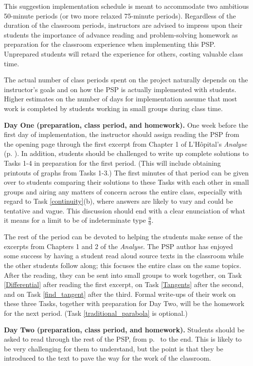 \documentclass[11pt]{article}
\begin{document}
This suggestion implementation schedule is meant to accommodate two ambitious 50-minute periods (or two more relaxed 75-minute periods). Regardless of the duration of the classroom periods, instructors are advised to impress upon their students the importance of advance reading and problem-solving homework as preparation for the classroom experience when implementing this PSP. Unprepared students will retard the experience for others, costing valuable class time.

The actual number of class periods spent on the project naturally  depends on the instructor's goals and on how the PSP is actually implemented with students.  Higher estimates on the number of days for implementation assume that most work is completed by students working in small groups during class time.

{\bf Day One (preparation, class period, and homework).} One week before the first day of implementation, the instructor should assign reading the PSP from the opening page through the first excerpt from Chapter 1 of L'H\^opital's \emph{Analyse} (p. \pageref{Ch1}). In addition, students should be challenged to write up complete solutions to Tasks 1-4 in preparation for the first period. (This will include obtaining printouts of graphs from Tasks 1-3.) The first minutes of that period can be given over to students comparing their solutions to these Tasks with each other in small groups and airing any matters of concern across the entire class, especially with regard to Task \ref{continuity}(b), where answers are likely to vary and could be tentative and vague. This discussion should end with a clear enunciation of what it means for a limit to be of indeterminate type $\frac00$. 

The rest of the period can be devoted to helping the students make sense of the excerpts from Chapters 1 and 2 of the \emph{Analyse}. The PSP author has enjoyed some success by having a student read aloud source texts in the classroom while the other students follow along; this focuses the entire class on the same topics. After the reading, they can be sent into small groups to work together, on Task \ref{Differential} after reading the first excerpt, on Task \ref{Tangents} after the second, and on Task \ref{find_tangent} after the third. Formal write-ups of their work on these three Tasks, together with preparation for Day Two, will be the homework for the next period. (Task \ref{traditional_parabola} is optional.)

{\bf Day Two (preparation, class period, and homework).} Students should be asked to read through the rest of the PSP, from p.~\pageref{traditional_parabola} to the end. This is likely to be very challenging for them to understand, but the point is that they be introduced to the text to pave the way for the work of the classroom. 
\end{document}
